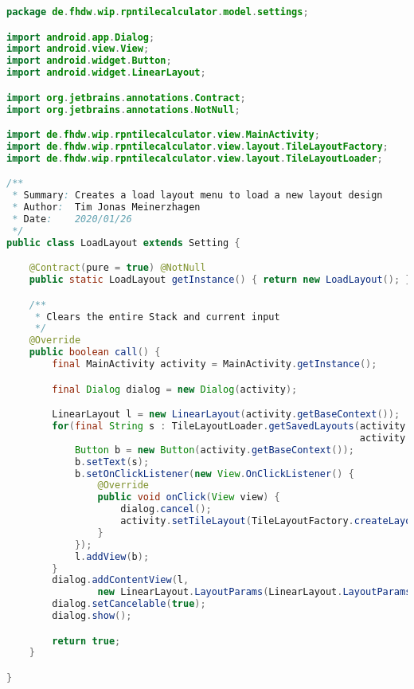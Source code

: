 \begin{lstlisting}[caption=LoadLayout (Meinerzhagen),label=list:LoadLayout,language=Java]
package de.fhdw.wip.rpntilecalculator.model.settings;

import android.app.Dialog;
import android.view.View;
import android.widget.Button;
import android.widget.LinearLayout;

import org.jetbrains.annotations.Contract;
import org.jetbrains.annotations.NotNull;

import de.fhdw.wip.rpntilecalculator.view.MainActivity;
import de.fhdw.wip.rpntilecalculator.view.layout.TileLayoutFactory;
import de.fhdw.wip.rpntilecalculator.view.layout.TileLayoutLoader;

/**
 * Summary: Creates a load layout menu to load a new layout design
 * Author:  Tim Jonas Meinerzhagen
 * Date:    2020/01/26
 */
public class LoadLayout extends Setting {

    @Contract(pure = true) @NotNull
    public static LoadLayout getInstance() { return new LoadLayout(); }

    /**
     * Clears the entire Stack and current input
     */
    @Override
    public boolean call() {
        final MainActivity activity = MainActivity.getInstance();

        final Dialog dialog = new Dialog(activity);

        LinearLayout l = new LinearLayout(activity.getBaseContext());
        for(final String s : TileLayoutLoader.getSavedLayouts(activity.getBaseContext(),
                                                              activity.getTileLayout().getOrientation())){
            Button b = new Button(activity.getBaseContext());
            b.setText(s);
            b.setOnClickListener(new View.OnClickListener() {
                @Override
                public void onClick(View view) {
                    dialog.cancel();
                    activity.setTileLayout(TileLayoutFactory.createLayout(activity, activity.getTileLayout().getOrientation().getIndicator() + "_" + s));
                }
            });
            l.addView(b);
        }
        dialog.addContentView(l,
                new LinearLayout.LayoutParams(LinearLayout.LayoutParams.WRAP_CONTENT, LinearLayout.LayoutParams.WRAP_CONTENT));
        dialog.setCancelable(true);
        dialog.show();

        return true;
    }

}
\end{lstlisting}    


